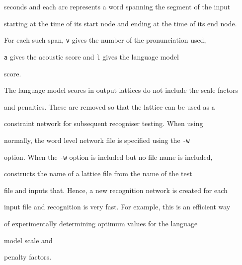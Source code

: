 seconds and each arc represents a word spanning the segment of the input


starting at the time of its start node and ending at the time of its end node.  


For each such span, \texttt{v} gives the number of the pronunciation used, 


\texttt{a} gives the acoustic score and \texttt{l} gives the language model


score.





The language model scores in output lattices do not include the scale factors


and penalties.  These are removed so that the lattice can be used as a


constraint network for subsequent recogniser testing.  When using 


normally, the word level network file is specified using the \texttt{-w}


option.  When the \texttt{-w} option is included but no file name is included,


 constructs the name of a lattice file from the name of the test


file and inputs that.  Hence, a new recognition network is created for each


input file and recognition is very fast.  For example, this is an efficient way


of experimentally determining optimum values for the language 


model scale and


penalty factors.
















